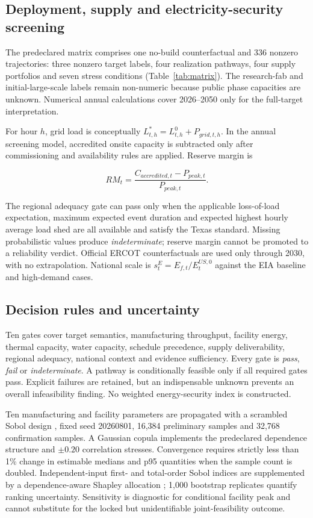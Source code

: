 \documentclass[11pt]{article}
\begin{document}
\subsection{Deployment, supply and electricity-security screening}

The predeclared matrix comprises one no-build counterfactual and 336 nonzero
trajectories: three nonzero target labels, four realization pathways, four
supply portfolios and seven stress conditions (Table~\ref{tab:matrix}). The
research-fab and initial-large-scale labels remain non-numeric because public
phase capacities are unknown. Numerical annual calculations cover 2026--2050
only for the full-target interpretation.

For hour $h$, grid load is conceptually $L^*_{t,h}=L^0_{t,h}+P_{grid,t,h}$.
In the annual screening model, accredited onsite capacity is subtracted only
after commissioning and availability rules are applied. Reserve margin is

\begin{equation}
RM_t=\frac{C_{accredited,t}-P_{peak,t}}{P_{peak,t}}.
\label{eq:rm}
\end{equation}

The regional adequacy gate can pass only when the applicable loss-of-load
expectation, maximum expected event duration and expected highest hourly
average load shed are all available and satisfy the Texas standard. Missing
probabilistic values produce \emph{indeterminate}; reserve margin cannot be
promoted to a reliability verdict. Official ERCOT counterfactuals are used only
through 2030, with no extrapolation. National scale is
$s_t^E=E_{f,t}/E_{t}^{US,0}$ against the EIA baseline and high-demand cases.

\subsection{Decision rules and uncertainty}

Ten gates cover target semantics, manufacturing throughput, facility energy,
thermal capacity, water capacity, schedule precedence, supply deliverability,
regional adequacy, national context and evidence sufficiency. Every gate is
\emph{pass}, \emph{fail} or \emph{indeterminate}. A pathway is conditionally
feasible only if all required gates pass. Explicit failures are retained, but
an indispensable unknown prevents an overall infeasibility finding. No weighted
energy-security index is constructed.

Ten manufacturing and facility parameters are propagated with a scrambled
Sobol design \cite{Owen1998}, fixed seed 20260801, 16,384 preliminary samples
and 32,768 confirmation samples. A Gaussian copula implements the predeclared
dependence structure and $\pm0.20$ correlation stresses. Convergence requires
strictly less than 1\% change in estimable medians and p95 quantities when the
sample count is doubled. Independent-input first- and total-order Sobol indices
\cite{Saltelli2010} are supplemented by a dependence-aware Shapley allocation
\cite{OwenPrieur2017}; 1,000 bootstrap replicates quantify ranking uncertainty.
Sensitivity is diagnostic for conditional facility peak and cannot substitute
for the locked but unidentifiable joint-feasibility outcome.
\end{document}
